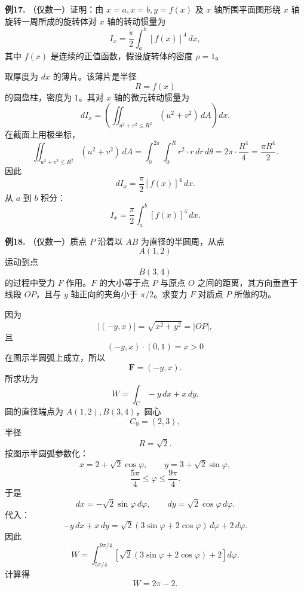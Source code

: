 \begin{problemblock}
\textbf{例17.} （仅数一）证明：由 \(x=a,x=b,y=f(x)\) 及 \(x\) 轴所围平面图形绕 \(x\) 轴旋转一周所成的旋转体对 \(x\) 轴的转动惯量为
\[
I_x=\frac{\pi}{2}\int_a^b[f(x)]^4\,dx,
\]
其中 \(f(x)\) 是连续的正值函数，假设旋转体的密度 \(\rho=1\)。
\end{problemblock}
\begin{solutionblock}
取厚度为 \(dx\) 的薄片。该薄片是半径
\[
R=f(x)
\]
的圆盘柱，密度为 \(1\)。其对 \(x\) 轴的微元转动惯量为
\[
dI_x=\left(\iint_{u^2+v^2\le R^2}(u^2+v^2)\,dA\right)dx.
\]
在截面上用极坐标，
\[
\iint_{u^2+v^2\le R^2}(u^2+v^2)\,dA
=\int_0^{2\pi}\int_0^R r^2\cdot r\,dr\,d\theta
=2\pi\cdot\frac{R^4}{4}
=\frac{\pi R^4}{2}.
\]
因此
\[
dI_x=\frac{\pi}{2}[f(x)]^4\,dx.
\]
从 \(a\) 到 \(b\) 积分：
\[
I_x=\frac{\pi}{2}\int_a^b[f(x)]^4\,dx.
\]
\end{solutionblock}

\begin{problemblock}
\textbf{例18.} （仅数一）质点 \(P\) 沿着以 \(AB\) 为直径的半圆周，从点
\[
A(1,2)
\]
运动到点
\[
B(3,4)
\]
的过程中受力 \(F\) 作用。\(F\) 的大小等于点 \(P\) 与原点 \(O\) 之间的距离，其方向垂直于线段 \(OP\)，且与 \(y\) 轴正向的夹角小于 \(\pi/2\)。求变力 \(F\) 对质点 \(P\) 所做的功。
\end{problemblock}
\begin{solutionblock}
因为
\[
|(-y,x)|=\sqrt{x^2+y^2}=|OP|,
\]
且
\[
(-y,x)\cdot(0,1)=x>0
\]
在图示半圆弧上成立，所以
\[
\mathbf F=(-y,x).
\]
所求功为
\[
W=\int_C -y\,dx+x\,dy.
\]
圆的直径端点为 \(A(1,2),B(3,4)\)，圆心
\[
C_0=(2,3),
\]
半径
\[
R=\sqrt2.
\]
按图示半圆弧参数化：
\[
x=2+\sqrt2\cos\varphi,\qquad
y=3+\sqrt2\sin\varphi,
\]
\[
\frac{5\pi}{4}\le\varphi\le\frac{9\pi}{4}.
\]
于是
\[
dx=-\sqrt2\sin\varphi\,d\varphi,\qquad
dy=\sqrt2\cos\varphi\,d\varphi.
\]
代入：
\[
-y\,dx+x\,dy
=\sqrt2(3\sin\varphi+2\cos\varphi)\,d\varphi+2\,d\varphi.
\]
因此
\[
W=\int_{5\pi/4}^{9\pi/4}
\left[\sqrt2(3\sin\varphi+2\cos\varphi)+2\right]d\varphi.
\]
计算得
\[
W=2\pi-2.
\]
\end{solutionblock}

